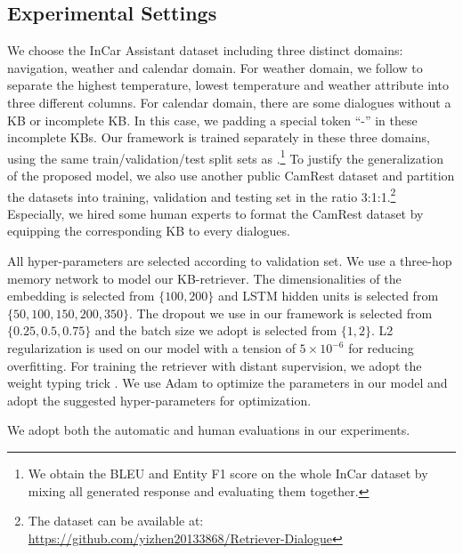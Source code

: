 \documentclass[11pt,a4paper]{article}
\begin{document}
 \subsection{Experimental Settings}
We choose the InCar Assistant dataset \cite{eric:2017:SIGDial} including three distinct domains: navigation, weather and calendar domain. 
For weather domain, we follow  to separate the highest temperature, lowest temperature and weather attribute into three different columns.
For calendar domain, there are some dialogues without a KB or incomplete KB.
In this case, we padding a special token ``-'' in these incomplete KBs.
Our framework is trained separately in these three domains, using the same train/validation/test split sets as .\footnote{We obtain the BLEU and Entity F1 score on the whole InCar dataset by mixing all generated response and evaluating them together.} 
To justify the generalization of the proposed model, we also use another public CamRest dataset \cite{wen:2017:EACL} and partition the datasets into training, validation and testing set in the ratio 3:1:1.\footnote{The dataset can be available at: \url{https://github.com/yizhen20133868/Retriever-Dialogue}}
Especially, we hired some human experts to format the CamRest dataset by equipping the corresponding KB to every dialogues. 
 
 All hyper-parameters are selected according
 to validation set. We use a three-hop memory network to model
 our KB-retriever.
 The dimensionalities of the embedding is selected from $\{100, 200\}$ and LSTM hidden units is selected from $\{50, 100, 150, 200, 350\}$.
 The dropout we use in our framework is selected from $\{0.25, 0.5, 0.75\}$ and the batch size we adopt is selected from  $\{1,2\}$.
 L2 regularization is used on our model with a tension of $5\times 10^{-6}$ for reducing overfitting.
 For training the retriever with distant supervision, we adopt the weight typing trick \cite{E17-1001}.
 We use Adam \cite{kingma-ba:2014:ICLR} to optimize the parameters in our model and 
 adopt the suggested hyper-parameters for optimization.
 
 We adopt both the automatic and human evaluations in our experiments.
 
 
\end{document}
